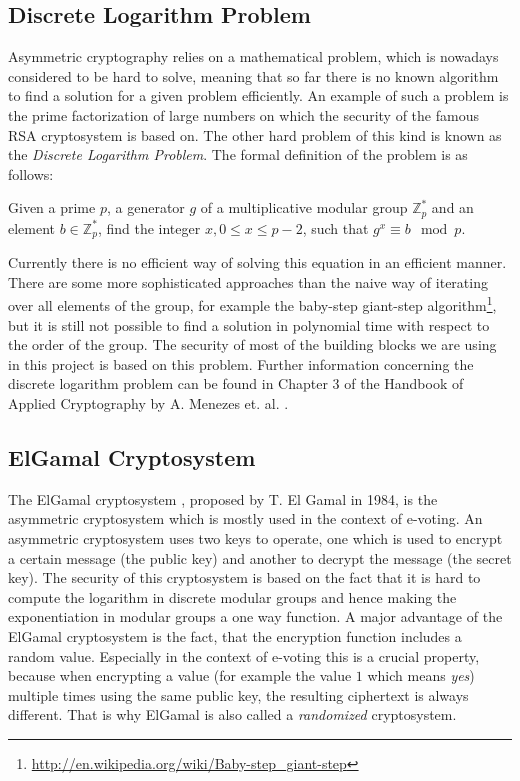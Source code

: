 \documentclass[numbers=noenddot, abstract=on, a4paper, headsepline,
footsepline, oneside, draft=off]{scrreprt}
\begin{document}
\subsection{Discrete Logarithm Problem}
\label{sec:discretelogarithm}
Asymmetric cryptography relies on a mathematical problem, which is nowadays
considered to be hard to solve, meaning that so far there is no known algorithm
to find a solution for a given problem efficiently. An example of such a problem
is the prime factorization of large numbers on which the security of the famous
RSA cryptosystem \cite{RSA78} is based on. The other hard problem of this kind
is known as the \emph{Discrete Logarithm Problem}. The formal definition of
the problem is as follows: 

Given a prime $p$, a generator $g$ of a multiplicative modular group
$\mathbb{Z}^*_p$ and an element $b \in \mathbb{Z}^*_p$, find the integer $x,0
\leq x \leq p - 2$, such that $g^x \equiv b \mod p$.

Currently there is no efficient way of solving this equation in an efficient
manner. There are some more sophisticated approaches than the naive way of
iterating over all elements of the group, for example the baby-step giant-step
algorithm\footnote{\url{http://en.wikipedia.org/wiki/Baby-step_giant-step}}, but
it is still not possible to find a solution in polynomial time with respect to
the order of the group. The security of most of the building blocks we are using
in this project is based on this problem. Further information concerning the
discrete logarithm problem can be found in Chapter 3 of the Handbook of Applied
Cryptography by A. Menezes et. al.
\cite{book:hac}.

\subsection{ElGamal Cryptosystem}
\label{sec:elgamal}
The ElGamal cryptosystem \cite{EG84}, proposed by T. El Gamal in 1984, is the
asymmetric cryptosystem which is mostly used in the context of e-voting. An
asymmetric cryptosystem uses two keys to operate, one which is used to encrypt a
certain message (the public key) and another to decrypt the message (the secret
key). The security of this cryptosystem is based on the fact that it is hard to
compute the logarithm in discrete modular groups and hence making the
exponentiation in modular groups a one way function. A major advantage of the
ElGamal cryptosystem is the fact, that the encryption function includes a random
value. Especially in the context of e-voting this is a crucial property, because
when encrypting a value (for example the value $1$ which means \textit{yes})
multiple times using the same public key, the resulting ciphertext is always
different. That is why ElGamal is also called a \textit{randomized}
cryptosystem.
\end{document}
